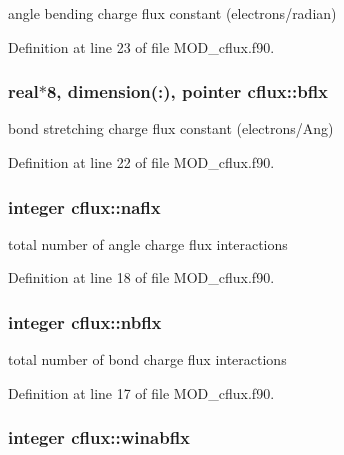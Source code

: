 angle bending charge flux constant (electrons/radian) 



Definition at line 23 of file M\-O\-D\-\_\-cflux.\-f90.

\hypertarget{classcflux_a9a62279c5b16a88b814e755246c30a78}{
\subsubsection[{bflx}]{\setlength{\rightskip}{0pt plus 5cm}real$\ast$8, dimension(\-:), pointer cflux\-::bflx}}\label{classcflux_a9a62279c5b16a88b814e755246c30a78}


bond stretching charge flux constant (electrons/\-Ang) 



Definition at line 22 of file M\-O\-D\-\_\-cflux.\-f90.

\hypertarget{classcflux_a14d709ce722049e7bd80e2c8c0bd69a8}{
\subsubsection[{naflx}]{\setlength{\rightskip}{0pt plus 5cm}integer cflux\-::naflx}}\label{classcflux_a14d709ce722049e7bd80e2c8c0bd69a8}


total number of angle charge flux interactions 



Definition at line 18 of file M\-O\-D\-\_\-cflux.\-f90.

\hypertarget{classcflux_a0d23ad3961edc2c3a554c3f612d7eaff}{
\subsubsection[{nbflx}]{\setlength{\rightskip}{0pt plus 5cm}integer cflux\-::nbflx}}\label{classcflux_a0d23ad3961edc2c3a554c3f612d7eaff}


total number of bond charge flux interactions 



Definition at line 17 of file M\-O\-D\-\_\-cflux.\-f90.

\hypertarget{classcflux_a48598280236f2e19830c02fcc740cc67}{
\subsubsection[{winabflx}]{\setlength{\rightskip}{0pt plus 5cm}integer cflux\-::winabflx}}\label{classcflux_a48598280236f2e19830c02fcc740cc67}


